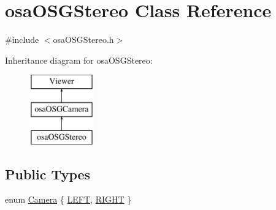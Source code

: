 \hypertarget{classosa_o_s_g_stereo}{}\section{osa\+O\+S\+G\+Stereo Class Reference}
\label{classosa_o_s_g_stereo}


{\ttfamily \#include $<$osa\+O\+S\+G\+Stereo.\+h$>$}

Inheritance diagram for osa\+O\+S\+G\+Stereo\+:\begin{figure}[H]
\begin{center}
\leavevmode
\includegraphics[height=3.000000cm]{da/d8d/classosa_o_s_g_stereo}
\end{center}
\end{figure}
\subsection*{Public Types}
\begin{DoxyCompactItemize}
\item 
enum \hyperlink{classosa_o_s_g_stereo_a6f3072fa8cc1d46fcedff6b2d497f396}{Camera} \{ \hyperlink{classosa_o_s_g_stereo_a6f3072fa8cc1d46fcedff6b2d497f396a7d425a8f4711074d0aada8186a7fabc4}{L\+E\+F\+T}, 
\hyperlink{classosa_o_s_g_stereo_a6f3072fa8cc1d46fcedff6b2d497f396a26b5df6fc40a2f0e4976129b85e091d1}{R\+I\+G\+H\+T}
 \}
\end{DoxyCompactItemize}
